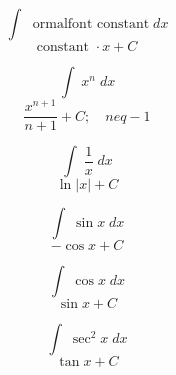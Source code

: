\documentclass[avery5371,grid]{flashcards}
\begin{document}
\begin{flashcard}{\large \vspace*{\fill} \[ \int\; \text{ 
ormalfont constant} \;dx  \] \vspace*{\fill}   }{\large \vspace*{\fill} \[ \text{constant } \cdot x + C  \] \vspace*{\fill}   }\end{flashcard}

\begin{flashcard}{\large \vspace*{\fill} \[ \int\; x^n \;dx  \] \vspace*{\fill}   }{\large \vspace*{\fill} \[ \dfrac{x^{n+1}}{n+1} + C ; \quad n 
eq -1  \] \vspace*{\fill}   }\end{flashcard}

\begin{flashcard}{\large \vspace*{\fill} \[ \int\; \dfrac{1}{x} \;dx \] \vspace*{\fill}   }{\large \vspace*{\fill} \[ \ln|x| + C  \] \vspace*{\fill}   }\end{flashcard}

\begin{flashcard}{\large \vspace*{\fill} \[ \int\; \sin x \;dx  \] \vspace*{\fill}   }{\large \vspace*{\fill} \[ -\cos x + C  \] \vspace*{\fill}   }\end{flashcard}

\begin{flashcard}{\large \vspace*{\fill} \[ \int\; \cos x \;dx \] \vspace*{\fill}   }{\large \vspace*{\fill} \[ \sin x + C  \] \vspace*{\fill}   }\end{flashcard}

\begin{flashcard}{\large \vspace*{\fill} \[ \int\; \sec^2 x \;dx  \] \vspace*{\fill}   }{\large \vspace*{\fill} \[ \tan x + C \] \vspace*{\fill}   }\end{flashcard}
\end{document}
